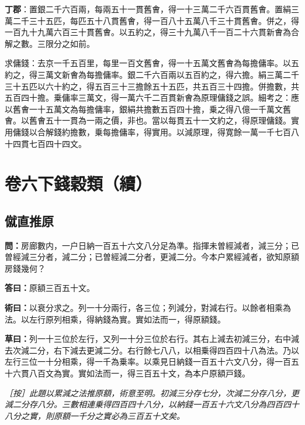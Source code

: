 \documentclass[11pt,a4paper]{article}
\newcommand{\Question}[1]{\par\noindent\textbf{\color{problemcolor}問：}#1\par}
\newcommand{\Answer}[1]{\par\noindent\textbf{\color{answercolor}答曰：}#1\par}
\newcommand{\Method}[1]{\par\noindent\textbf{\color{methodcolor}術曰：}#1\par}
\newcommand{\Working}[1]{\par\noindent\textbf{草曰：}#1\par}
\newcommand{\EditorialNote}[1]{\par\noindent\textit{［按］#1}\par}
\begin{document}
{\textbf{丁郡}：置銀二千六百兩，每兩五十一貫舊㑹，得一十三萬二千六百貫舊㑹。置絹三萬二千三十五匹，每匹五十八貫舊㑹，得一百八十五萬八千三十貫舊㑹。併之，得一百九十九萬六百三十貫舊㑹。以五約之，得三十九萬八千一百二十六貫新㑹為合解之數。三限分之如前。

求傭錢：去京一千五百里，每里一百文舊㑹，得一十五萬文舊㑹為每擔傭率。以五約之，得三萬文新㑹為每擔傭率。銀二千六百兩以五百約之，得六擔。絹三萬二千三十五匹以六十約之，得五百三十三擔餘五十五匹，共五百三十四擔。併擔數，共五百四十擔。乗傭率三萬文，得一萬六千二百貫新㑹為原理傭錢之誤。細考之：應以舊㑹一十五萬文為每擔傭率，銀絹共擔數五百四十擔，乗之得八億一千萬文舊㑹。以舊㑹五十一貫為一兩之價，非也。當以每貫五十一文約之，得原理傭錢。實用傭錢以合解錢約擔數，乗每擔傭率，得實用。以減原理，得寛餘一萬一千七百八十四貫七百四十四文。}


\newpage
\section*{\color{titlecolor}卷六下\quad 錢穀類（續）}

\subsection*{\color{sectioncolor}僦直推原}

\Question{房廊數内，一户日納一百五十六文八分足為準。指揮未曽經減者，減三分；已曽經減三分者，減二分；已曽經減二分者，更減二分。今本户累經減者，欲知原額房錢幾何？}

\Answer{原額三百五十文。}

\Method{以衰分求之。列一十分兩行，各三位；列減分，對減右行。以餘者相乘為法。以左行原列相乘，得納錢為實。實如法而一，得原額錢。}

\Working{列一十三位於左行，又列一十分三位於右行。其右上減去初減三分，右中減去次減二分，右下減去更減二分。右行餘七八八，以相乗得四百四十八為法。乃以左行三位一十分相乘，得一千為乗率。以乘見日納錢一百五十六文八分，得一百五十六貫八百文為實。實如法而一，得三百五十文，為本户原額戸錢。}

\EditorialNote{此題以累減之法推原額，術意至明。初減三分存七分，次減二分存八分，更減二分存八分。三數相連乗得四百四十八分，以納錢一百五十六文八分為四百四十八分之實，則原額一千分之實必為三百五十文矣。}
\end{document}
